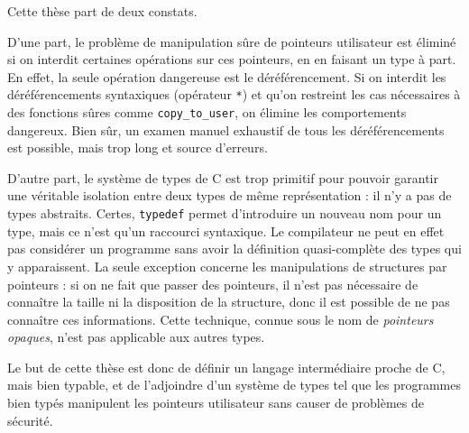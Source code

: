 
Cette thèse part de deux constats.

D'une part, le problème de manipulation sûre de pointeurs utilisateur est
éliminé si on interdit certaines opérations sur ces pointeurs, en en faisant un
type à part. En effet, la seule opération dangereuse est le déréférencement. Si
on interdit les déréférencements syntaxiques (opérateur \texttt{*}) et qu'on
restreint les cas nécessaires à des fonctions sûres comme
\texttt{copy\_to\_user}, on élimine les comportements dangereux. Bien sûr, un
examen manuel exhaustif de tous les déréférencements est possible, mais trop
long et source d'erreurs.

D'autre part, le système de types de C est trop primitif pour pouvoir garantir
une véritable isolation entre deux types de même représentation : il n'y a pas
de types abstraits. Certes, \texttt{typedef} permet d'introduire un nouveau nom
pour un type, mais ce n'est qu'un raccourci syntaxique. Le compilateur ne peut
en effet pas considérer un programme sans avoir la définition quasi-complète des
types qui y apparaissent. La seule exception concerne les manipulations de
structures par pointeurs : si on ne fait que passer des pointeurs, il n'est pas
nécessaire de connaître la taille ni la disposition de la structure, donc il est
possible de ne pas connaître ces informations. Cette technique, connue sous le
nom de \emph{pointeurs opaques}, n'est pas applicable aux autres types.

Le but de cette thèse est donc de définir un langage intermédiaire proche de C,
mais bien typable, et de l'adjoindre d'un système de types tel que les
programmes bien typés manipulent les pointeurs utilisateur sans causer de
problèmes de sécurité.

